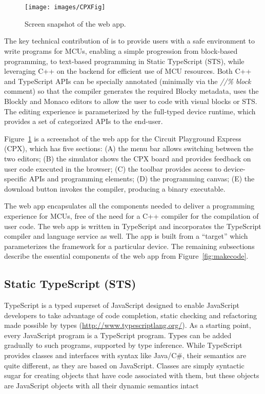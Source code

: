 \section{\MC}
\label{sec:makecode}

\begin{figure}[ht]
    \texttt{[image: images/CPXFig]}
\caption{\label{fig:screenSnap}Screen snapshot of the \MC web app.}
\end{figure}
The key technical contribution of \MC is to provide users with a safe environment to write programs for MCUs, enabling a simple progression from block-based programming, to text-based programming in Static TypeScript (STS), while leveraging C++ on the backend for efficient use of MCU resources. Both C++ and TypeScript APIs can be specially annotated (minimally via the \emph{//\% block} comment) so that the \MC compiler generates the required Blocky metadata, \MC uses the Blockly and Monaco editors to allow the user to code with visual blocks or STS. The editing experience is parameterized by the full-typed device runtime, which provides a set of categorized APIs to the end-user.

Figure~\ref{fig:screenSnap} is a screenshot of the \MC web app for the Circuit Playground Express (CPX), which has five sections: (A) the menu bar allows switching between the two editors; (B) the simulator shows the CPX board and provides feedback on user code executed in the browser; (C) the toolbar provides access to device-specific APIs and programming elements; (D) the programming canvas; (E) the download button invokes the compiler, producing a binary executable.

The web app encapsulates all the components needed to deliver a programming experience for MCUs, free of the need for a C++ compiler for the compilation of user code. The web app is written in TypeScript and incorporates the TypeScript compiler and language service as well. The app is built from a \MC ``target'' which parameterizes the \MC framework for a particular device. The remaining subsections describe the essential components of the web app from Figure~\ref{fig:makecode}.

\subsection{Static TypeScript (STS)}

TypeScript is a typed superset of JavaScript designed to enable JavaScript developers to take advantage of code
completion, static checking and refactoring made possible by types (\url{http://www.typescriptlang.org/}).
As a starting point, every JavaScript program is a TypeScript program.  Types can be added gradually to such programs, supported by type inference. While TypeScript provides classes and interfaces with syntax like
Java/C\#, their semantics are quite different, as they are based on JavaScript. Classes are simply syntactic sugar for creating objects that have code associated with them, but these objects are
JavaScript objects with all their dynamic semantics intact

